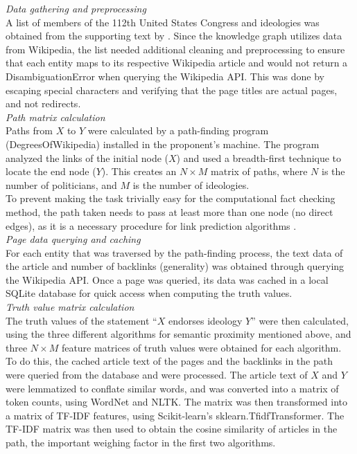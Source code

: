 \documentclass[10pt,11pt,12pt,oneside]{book}
\begin{document}
\textit{Data gathering and preprocessing}\\

A list of members of the 112th United States Congress and ideologies was obtained from the supporting text by \cite{ciampaglia2015computational}. Since the knowledge graph utilizes data from Wikipedia, the list needed additional cleaning and preprocessing to ensure that each entity maps to its respective Wikipedia article and would not return a DisambiguationError when querying the Wikipedia API. This was done by escaping special characters and verifying that the page titles are actual pages, and not redirects.\\

\textit{Path matrix calculation}\\

Paths from $X$ to $Y$ were calculated by a path-finding program (DegreesOfWikipedia) installed in the proponent's machine. The program analyzed the links of the initial node ($X$) and used a breadth-first technique to locate the end node ($Y$). This creates an $N \times M$ matrix of paths, where $N$ is the number of politicians, and $M$ is the number of ideologies.\\

To prevent making the task trivially easy for the computational fact checking method, the path taken needs to pass at least more than one node (no direct edges), as it is a necessary procedure for link prediction algorithms \cite{liben-nowell_kleinberg_2007}.\\

\textit{Page data querying and caching}\\

For each entity that was traversed by the path-finding process, the text data of the article and number of backlinks (generality) was obtained through querying the Wikipedia API. Once a page was queried, its data was cached in a local SQLite database for quick access when computing the truth values.\\

\textit{Truth value matrix calculation}\\

The truth values of the statement “$X$ endorses ideology $Y$” were then calculated, using the three different algorithms for semantic proximity mentioned above, and three $N \times M$ feature matrices of truth values were obtained for each algorithm.\\

To do this, the cached article text of the pages and the backlinks in the path were queried from the database and were processed. The article text of $ X $ and $ Y $ were lemmatized to conflate similar words, and was converted into a matrix of token counts, using WordNet and NLTK. The matrix was then transformed into a matrix of TF-IDF features, using Scikit-learn's sklearn.TfidfTransformer. The TF-IDF matrix was then used to obtain the cosine similarity of articles in the path, the important weighing factor in the first two algorithms.\\
\end{document}
